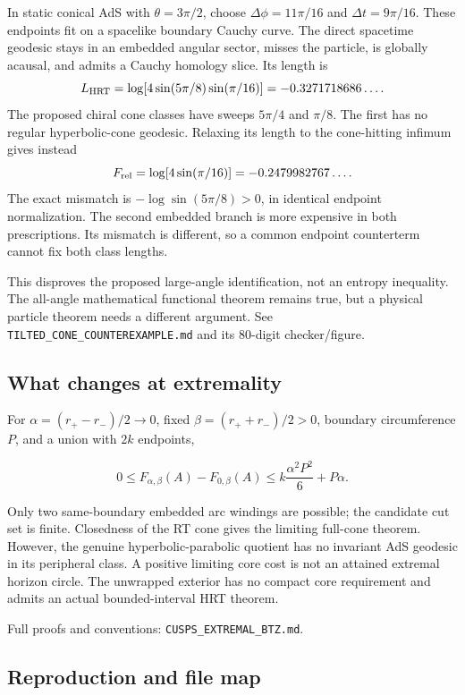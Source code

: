 \documentclass[11pt]{article}
\begin{document}
In static conical AdS with \(\theta=3\pi/2\), choose
\(\Delta\phi=11\pi/16\) and \(\Delta t=9\pi/16\). These endpoints fit on
a spacelike boundary Cauchy curve. The direct spacetime geodesic stays
in an embedded angular sector, misses the particle, is globally acausal,
and admits a Cauchy homology slice. Its length is \[
L_{\rm HRT}=\log\!\left[4\sin(5\pi/8)\sin(\pi/16)\right]
=-0.3271718686\ldots.
\] The proposed chiral cone classes have sweeps \(5\pi/4\) and
\(\pi/8\). The first has no regular hyperbolic-cone geodesic. Relaxing
its length to the cone-hitting infimum gives instead \[
F_{\rm rel}=\log\!\left[4\sin(\pi/16)\right]
=-0.2479982767\ldots.
\] The exact mismatch is \(-\log\sin(5\pi/8)>0\), in identical endpoint
normalization. The second embedded branch is more expensive in both
prescriptions. Its mismatch is different, so a common endpoint
counterterm cannot fix both class lengths.

This disproves the proposed large-angle identification, not an entropy
inequality. The all-angle mathematical functional theorem remains true,
but a physical particle theorem needs a different argument. See
\texttt{TILTED\_\allowbreak CONE\_\allowbreak COUNTEREXAMPLE.md} and its 80-digit
checker/figure.

\subsection{What changes at
extremality}\label{what-changes-at-extremality}

For \(\alpha=(r_+-r_-)/2\to0\), fixed \(\beta=(r_++r_-)/2>0\), boundary
circumference \(P\), and a union with \(2k\) endpoints,

\[
0\le F_{\alpha,\beta}(A)-F_{0,\beta}(A)
\le k\frac{\alpha^2P^2}{6}+P\alpha.
\]

Only two same-boundary embedded arc windings are possible; the candidate
cut set is finite. Closedness of the RT cone gives the limiting
full-cone theorem. However, the genuine hyperbolic-parabolic quotient
has no invariant AdS geodesic in its peripheral class. A positive
limiting core cost is not an attained extremal horizon circle. The
unwrapped exterior has no compact core requirement and admits an actual
bounded-interval HRT theorem.

Full proofs and conventions: \texttt{CUSPS\_\allowbreak EXTREMAL\_\allowbreak BTZ.md}.

\subsection{Reproduction and file map}\label{reproduction-and-file-map}
\end{document}
